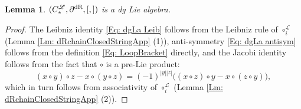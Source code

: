 \documentclass[10pt]{amsart}
\numberwithin{equation}{section}
\theoremstyle{plain}
\newtheorem{lemma}[theorem]{Lemma}
\theoremstyle{definition}
\theoremstyle{remark}
\numberwithin{equation}{section}
\newcommand{\dR}{\textup{dR}}
\newcommand{\CFr}{C_*^\mathscr{L}}
\begin{document}
{\begin{lemma}\label{Lm: StructureOnClosedStatesDRApp}
	$(\CFr,\partial^\dR, [,])$ is a dg Lie algebra.
\end{lemma}
\begin{proof}
The Leibniz identity \eqref{Eq: dgLa Leib} follows from the Leibniz rule of $\circ_i^\mathscr{L}$ (Lemma \ref{Lm: dRchainClosedStringApp} (1)), anti-symmetry \eqref{Eq: dgLa antisym} follows from the definition \eqref{Eq: LoopBracket} directly, and the Jacobi identity follows from the fact that $\circ$ is a pre-Lie product:
\[
	(x\circ y)\circ z - x\circ (y\circ z)  = (-1)^{|y||z|} \big((x\circ z)\circ y - x\circ(z\circ y)\big),
\]
which in turn follows from associativity of $\circ_i^\mathscr{L}$ (Lemma \ref{Lm: dRchainClosedStringApp} (2)).
\end{proof}


}
\end{document}

